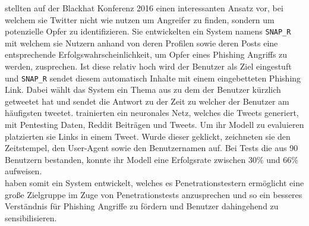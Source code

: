 \documentclass[
    12pt, %
    DIV10,
    ngerman, %
    a4paper, %
    oneside, %
    titlepage, %
    parskip=half, %
    headings=normal, %
    listof=totoc, %
    bibliography=totoc, %
    index=totoc, %
    captions=tableheading, %
    final %
]{scrreprt}
\begin{document}
\textcite{Seymour} stellten auf der Blackhat Konferenz 2016 einen interessanten Ansatz vor, bei welchem sie Twitter nicht wie \textcite{Javed2019} nutzen um Angreifer zu finden, sondern um potenzielle Opfer zu identifizieren. Sie entwickelten ein System namens \texttt{SNAP\_R} mit welchem sie Nutzern anhand von deren Profilen sowie deren Posts eine entsprechende Erfolgswahrscheinlichkeit, um Opfer eines Phishing Angriffs zu werden, zusprechen. Ist diese relativ hoch wird der Benutzer als Ziel eingestuft und \texttt{SNAP\_R} sendet diesem automatisch Inhalte mit einem eingebetteten Phishing Link. Dabei wählt das System ein Thema aus zu dem der Benutzer kürzlich getweetet hat und sendet die Antwort zu der Zeit zu welcher der Benutzer am häufigsten tweetet. \textcite{Seymour} trainierten ein neuronales Netz, welches die Tweets generiert, mit Pentesting Daten, Reddit Beiträgen und Tweets. Um ihr Modell zu evaluieren platzierten sie Links in einem Tweet. Wurde dieser geklickt, zeichneten sie den Zeitstempel, den User-Agent sowie den Benutzernamen auf. Bei Tests die aus 90 Benutzern bestanden, konnte ihr Modell eine Erfolgsrate zwischen 30\% und 66\% aufweisen.\\
\textcite{Seymour} haben somit ein System entwickelt, welches es Penetrationstestern ermöglicht eine gro{\ss}e Zielgruppe im Zuge von Penetrationstests anzusprechen und so ein besseres Verständnis für Phishing Angriffe zu fördern und Benutzer dahingehend zu sensibilisieren.
\end{document}
